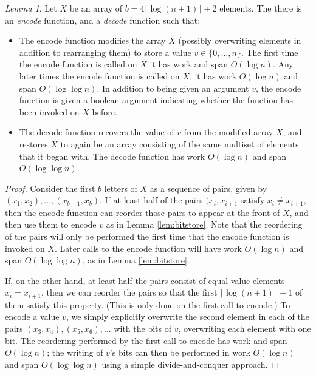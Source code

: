 \documentclass[sigplan, 10pt, nonacm]{acmart}
\theoremstyle{remark}
\newtheorem{lemma}[thm]{Lemma}
\theoremstyle{remark}
\begin{document}
\begin{appendices}
\begin{lemma}
Let $X$ be an array of $b = 4 \lceil \log (n + 1) \rceil + 2$
elements. The there is an \emph{encode} function, and a \emph{decode}
function such that:
\begin{itemize}
\item The encode function modifies the array $X$ (possibly overwriting
  elements in addition to rearranging them) to store a value $v \in
  \{0, \ldots, n\}$. The first time the encode function is called on
  $X$ it has work and span $O(\log n)$. Any later times the encode
  function is called on $X$, it has work $O(\log n)$ and span $O(\log
  \log n)$. In addition to being given an argument $v$, the encode
  function is given a boolean argument indicating whether the function
  has been invoked on $X$ before.
\item The decode function recovers the value of $v$ from the modified
  array $X$, and restores $X$ to again be an array consisting of the
  same multiset of elements that it began with. The decode function
  has work $O(\log n)$ and span $O(\log \log n)$.
\end{itemize}
  \label{lem:bitstore2}
\end{lemma}
\begin{proof}
Consider the first $b$ letters of $X$ as a sequence of pairs, given by
$(x_1, x_2), \ldots, (x_{b - 1}, x_b)$. If at least half of the pairs
$(x_i, x_{i + 1}$ satisfy $x_i \neq x_{i + 1}$, then the encode
function can reorder those pairs to appear at the front of $X$, and
then use them to encode $v$ as in Lemma \ref{lem:bitstore}. Note that
the reordering of the pairs will only be performed the first time that
the encode function is invoked on $X$. Later calls to the encode
function will have work $O(\log n)$ and span $O(\log \log n)$, as in
Lemma \ref{lem:bitstore}.

If, on the other hand, at least half the pairs consist of equal-value
elements $x_i = x_{i + 1}$, then we can reorder the pairs so that the
first $\lceil \log (n + 1) \rceil + 1$ of them satisfy this
property. (This is only done on the first call to encode.) To encode a
value $v$, we simply explicitly overwrite the second element in each
of the pairs $(x_3, x_4), (x_5, x_6), \ldots$ with the bits of $v$,
overwriting each element with one bit. The reordering performed by the
first call to encode has work and span $O(\log n)$; the writing of
$v$'s bits can then be performed in work $O(\log n)$ and span $O(\log
\log n)$ using a simple divide-and-conquer approach.


\end{proof}
\end{appendices}
\end{document}
